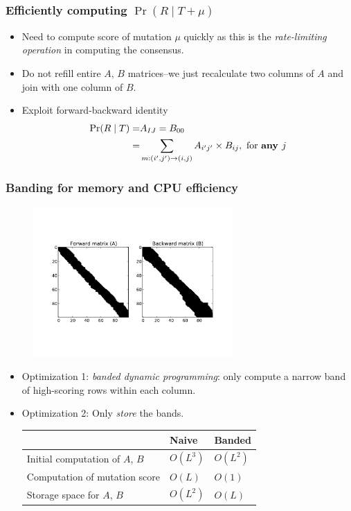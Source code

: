 \documentclass[serif,11pt]{beamer}
\begin{document}
\begin{frame}
\frametitle{Efficiently computing $\Pr(R \mid T + \mu)$}
\label{sec-6-9}

\begin{itemize}
\item Need to compute score of mutation $\mu$ quickly as this is the
     \emph{rate-limiting operation} in computing the consensus.
\item Do not refill entire $A$, $B$ matrices--we just recalculate two
     columns of $A$ and join with one column of $B$.
\item Exploit forward-backward identity
     \begin{align*}
     \Pr(R \mid T)     =& A_{IJ} = B_{00} \\
                       =& \sum_{m: (i',j') \to (i, j)} A_{i'j'} \times B_{ij},
                       \text{ for \bf{any} $j$}
     \end{align*}
\end{itemize}
\end{frame}
\begin{frame}
\frametitle{Banding for memory and CPU efficiency}
\label{sec-6-10}

   \begin{figure}
   \centering
   \includegraphics[width=3in]{img/sparsity}
   \end{figure}

\begin{itemize}
\item Optimization 1: \emph{banded dynamic programming}: only compute a narrow band of
     high-scoring rows within each column.
\item Optimization 2: Only \emph{store} the bands.

\begin{center}
\begin{tabular}{lll}
                                  &  Naive     &  Banded    \\
\hline
 Initial computation of $A$, $B$  &  $O(L^3)$  &  $O(L^2)$  \\
 Computation of mutation score    &  $O(L)$    &  $O(1)$    \\
 Storage space for $A$, $B$       &  $O(L^2)$  &  $O(L)$    \\
\end{tabular}
\end{center}


\end{itemize}
\end{frame}
\end{document}
